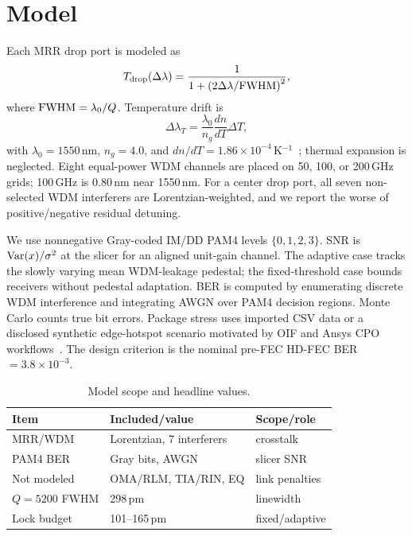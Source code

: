\documentclass[conference]{IEEEtran}
\begin{document}
\section{Model}
Each MRR drop port is modeled as
\begin{equation}
T_{\rm drop}(\Delta\lambda)=\frac{1}{1+\left(2\Delta\lambda/{\rm FWHM}\right)^2},
\end{equation}
where ${\rm FWHM}=\lambda_0/Q$. Temperature drift is
\begin{equation}
\Delta\lambda_T=\frac{\lambda_0}{n_g}\frac{dn}{dT}\Delta T,
\end{equation}
with $\lambda_0=1550$\,nm, $n_g=4.0$, and $dn/dT=1.86{\times}10^{-4}$\,K$^{-1}$~\cite{komma2012}; thermal expansion is neglected. Eight equal-power WDM channels are placed on 50, 100, or 200\,GHz grids; 100\,GHz is 0.80\,nm near 1550\,nm. For a center drop port, all seven non-selected WDM interferers are Lorentzian-weighted, and we report the worse of positive/negative residual detuning.

We use nonnegative Gray-coded IM/DD PAM4 levels $\{0,1,2,3\}$. SNR is ${\rm Var}(x)/\sigma^2$ at the slicer for an aligned unit-gain channel. The adaptive case tracks the slowly varying mean WDM-leakage pedestal; the fixed-threshold case bounds receivers without pedestal adaptation. BER is computed by enumerating discrete WDM interference and integrating AWGN over PAM4 decision regions. Monte Carlo counts true bit errors. Package stress uses imported CSV data or a disclosed synthetic edge-hotspot scenario motivated by OIF and Ansys CPO workflows~\cite{oif2023,ansys2026}. The design criterion is the nominal pre-FEC HD-FEC BER $=3.8{\times}10^{-3}$.

\begin{table}[!h]
\centering
\caption{Model scope and headline values.}
\label{tab:scope}
\scriptsize
\begin{tabular}{@{}lll@{}}
\toprule
Item & Included/value & Scope/role\\
\midrule
MRR/WDM & Lorentzian, 7 interferers & crosstalk\\
PAM4 BER & Gray bits, AWGN & slicer SNR\\
Not modeled & OMA/RLM, TIA/RIN, EQ & link penalties\\
$Q{=}5200$ FWHM & 298\,pm & linewidth\\
Lock budget & 101--165\,pm & fixed/adaptive\\
\bottomrule
\end{tabular}
\end{table}
\end{document}
